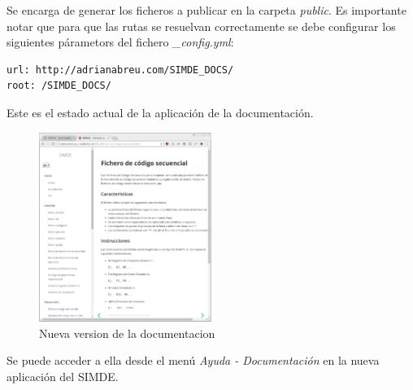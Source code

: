 Se encarga de generar los ficheros a publicar en la carpeta \textit{public}. Es importante notar que para
que las rutas se resuelvan correctamente se debe configurar los siguientes párametors del fichero 
\textit{\_config.yml}:

\begin{lstlisting}
url: http://adrianabreu.com/SIMDE_DOCS/
root: /SIMDE_DOCS/
\end{lstlisting}

\bigskip
Este es el estado actual de la aplicación de la documentación.

\begin{figure}[!th]
\begin{center}
\includegraphics[width=0.5\textwidth]{images/cap5/nueva-documentacion.eps}
\caption{Nueva version de la documentacion}
\label{fig:Nueva version de la documentacion}
\end{center}
\end{figure}

\bigskip
Se puede acceder a ella desde el menú \textit{Ayuda - Documentación} en la nueva aplicación del SIMDE.